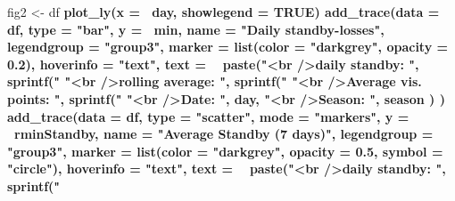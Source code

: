 \documentclass[
  a4paperpaper,
]{book}
\newenvironment{Shaded}{\begin{snugshade}}{\end{snugshade}}
\newcommand{\DataTypeTok}[1]{\textcolor[rgb]{0.13,0.29,0.53}{#1}}
\newcommand{\FloatTok}[1]{\textcolor[rgb]{0.00,0.00,0.81}{#1}}
\newcommand{\KeywordTok}[1]{\textcolor[rgb]{0.13,0.29,0.53}{\textbf{#1}}}
\newcommand{\NormalTok}[1]{#1}
\newcommand{\OperatorTok}[1]{\textcolor[rgb]{0.81,0.36,0.00}{\textbf{#1}}}
\newcommand{\OtherTok}[1]{\textcolor[rgb]{0.56,0.35,0.01}{#1}}
\newcommand{\StringTok}[1]{\textcolor[rgb]{0.31,0.60,0.02}{#1}}
\let\oldShaded\Shaded
\let\endoldShaded\endShaded
\renewenvironment{Shaded}{\footnotesize\oldShaded}{\endoldShaded}
\begin{document}
\begin{Shaded}
\begin{Highlighting}[]
{{{{{{{{{{{{{{{{{{{{{{{{{{{{{{{{{{{{{{{{{{{{{{{{{{{{{{{{{{{{{\NormalTok{fig2 <-}\StringTok{ }\NormalTok{df }\OperatorTok{%
\StringTok{  }\KeywordTok{plot_ly}\NormalTok{(}\DataTypeTok{x =} \OperatorTok{~}\NormalTok{day, }\DataTypeTok{showlegend =} \OtherTok{TRUE}\NormalTok{) }\OperatorTok{%
\StringTok{  }\KeywordTok{add_trace}\NormalTok{(}\DataTypeTok{data =}\NormalTok{ df,}
            \DataTypeTok{type =} \StringTok{"bar"}\NormalTok{,}
            \DataTypeTok{y =} \OperatorTok{~}\NormalTok{min,}
            \DataTypeTok{name =} \StringTok{"Daily standby-losses"}\NormalTok{,}
            \DataTypeTok{legendgroup =} \StringTok{"group3"}\NormalTok{,}
            \DataTypeTok{marker =} \KeywordTok{list}\NormalTok{(}\DataTypeTok{color =} \StringTok{"darkgrey"}\NormalTok{, }\DataTypeTok{opacity =} \FloatTok{0.2}\NormalTok{),}
            \DataTypeTok{hoverinfo =} \StringTok{"text"}\NormalTok{,}
            \DataTypeTok{text =} \OperatorTok{~}\StringTok{ }\KeywordTok{paste}\NormalTok{(}\StringTok{"<br />daily standby:           "}\NormalTok{, }\KeywordTok{sprintf}\NormalTok{(}\StringTok{"%
                           \StringTok{"<br />rolling average:        "}\NormalTok{, }\KeywordTok{sprintf}\NormalTok{(}\StringTok{"%
                           \StringTok{"<br />Average vis. points: "}\NormalTok{, }\KeywordTok{sprintf}\NormalTok{(}\StringTok{"%
                           \StringTok{"<br />Date:                        "}\NormalTok{, day,}
                           \StringTok{"<br />Season:                   "}\NormalTok{, season}
\NormalTok{            )}
\NormalTok{  ) }\OperatorTok{%
\StringTok{  }\KeywordTok{add_trace}\NormalTok{(}\DataTypeTok{data =}\NormalTok{ df,}
            \DataTypeTok{type =} \StringTok{"scatter"}\NormalTok{,}
            \DataTypeTok{mode =} \StringTok{"markers"}\NormalTok{,}
            \DataTypeTok{y =} \OperatorTok{~}\NormalTok{rminStandby,}
            \DataTypeTok{name =} \StringTok{"Average Standby (7 days)"}\NormalTok{,}
            \DataTypeTok{legendgroup =} \StringTok{"group3"}\NormalTok{,}
            \DataTypeTok{marker =} \KeywordTok{list}\NormalTok{(}\DataTypeTok{color =} \StringTok{"darkgrey"}\NormalTok{, }\DataTypeTok{opacity =} \FloatTok{0.5}\NormalTok{, }\DataTypeTok{symbol =} \StringTok{"circle"}\NormalTok{),}
            \DataTypeTok{hoverinfo =} \StringTok{"text"}\NormalTok{,}
            \DataTypeTok{text =} \OperatorTok{~}\StringTok{ }\KeywordTok{paste}\NormalTok{(}\StringTok{"<br />daily standby:           "}\NormalTok{, }\KeywordTok{sprintf}\NormalTok{(}\StringTok{"%
}}}}}}}}}}}}}}}}}}}}}}}}}}}}}}}}}}}}}}}}}}}}}}}}}}}}}}}}}}}}}}}}}}}}
\end{Highlighting}
\end{Shaded}
\end{document}
